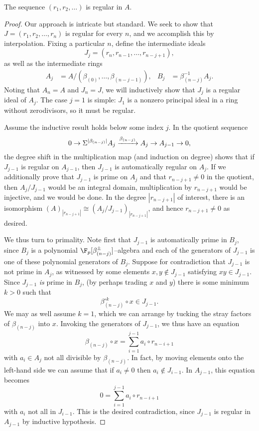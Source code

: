 \begin{lemma}
The sequence \((r_1, r_2, \ldots)\) is regular in \(A\).
\end{lemma}
\begin{proof}
Our approach is intricate but standard.  We seek to show that \(J = (r_1, r_2, \ldots, r_n)\) is regular for every \(n\), and we accomplish this by interpolation.  Fixing a particular \(n\), define the intermediate ideals \[J_j = (r_n, r_{n-1}, \ldots, r_{n-j+1}),\] as well as the intermediate rings
\begin{align*}
A_j & = A / (\beta_{(0)}, \ldots, \beta_{(n-j-1)}), &
B_j & = \beta_{(n-j)}^{-1} A_j.
\end{align*}
Noting that \(A_n = A\) and \(J_n = J\), we will inductively show that \(J_j\) is a regular ideal of \(A_j\).  The case \(j = 1\) is simple: \(J_1\) is a nonzero principal ideal in a ring without zerodivisors, so it must be regular.

Assume the inductive result holds below some index \(j\).  In the quotient sequence \[0 \to \Sigma^{|\beta_{(n-j)}|} A_j \xrightarrow{\beta_{(n-j)}} A_j \to A_{j-1} \to 0,\] the degree shift in the multiplication map (and induction on degree) shows that if \(J_{j-1}\) is regular on \(A_{j-1}\), then \(J_{j-1}\) is automatically regular on \(A_j\).  If we additionally prove that \(J_{j-1}\) is prime on \(A_j\) and that \(r_{n-j+1} \ne 0\) in the quotient, then \(A_j / J_{j-1}\) would be an integral domain, multiplication by \(r_{n-j+1}\) would be injective, and we would be done.  In the degree \(|r_{n-j+1}|\) of interest, there is an isomorphism \((A)_{|r_{n-j+1}|} \cong (A_j / J_{j-1})_{|r_{n-j+1}|}\), and hence \(r_{n-j+1} \ne 0\) as desired.

We thus turn to primality.  Note first that \(J_{j-1}\) is automatically prime in \(B_j\), since \(B_j\) is a polynomial \(\F_p[\beta_{(n-j)}^\pm]\)--algebra and each of the generators of \(J_{j-1}\) is one of these polynomial generators of \(B_j\).  Suppose for contradiction that \(J_{j-1}\) is not prime in \(A_j\), as witnessed by some elements \(x, y \not\in J_{j-1}\) satisfying \(xy \in J_{j-1}\).  Since \(J_{j-1}\) \emph{is} prime in \(B_j\), (by perhaps trading \(x\) and \(y\)) there is some minimum \(k > 0\) such that \[\beta_{(n-j)}^{\circ k} \circ x \in J_{j-1}.\]  We may as well assume \(k = 1\), which we can arrange by tucking the stray factors of \(\beta_{(n-j)}\) into \(x\).  Invoking the generators of \(J_{j-1}\), we thus have an equation \[\beta_{(n-j)} \circ x = \sum_{i = 1}^{j-1} a_i \circ r_{n-i+1}\] with \(a_i \in A_j\) not all divisible by \(\beta_{(n-j)}\).  In fact, by moving elements onto the left-hand side we can assume that if \(a_i \ne 0\) then \(a_i \not\in J_{i-1}\).  In \(A_{j-1}\), this equation becomes \[0 = \sum_{i=1}^{j-1} a_i \circ r_{n-i+1}\] with \(a_i\) not all in \(J_{i-1}\).  This is the desired contradiction, since \(J_{j-1}\) is regular in \(A_{j-1}\) by inductive hypothesis.
\end{proof}

